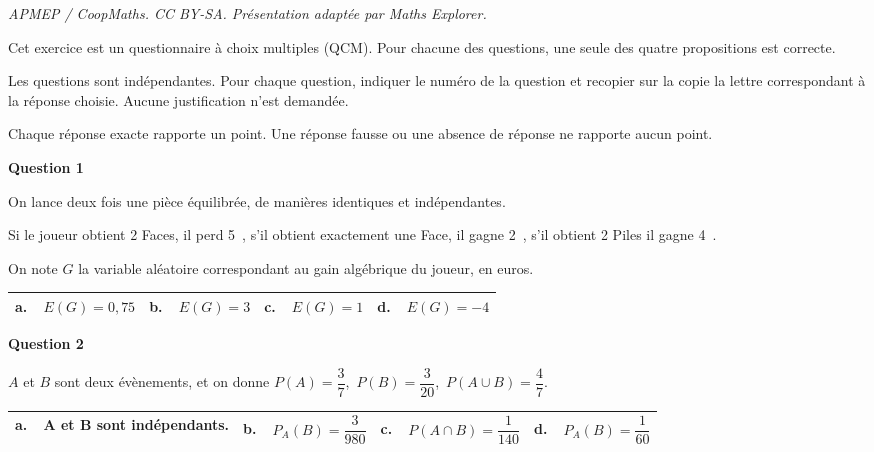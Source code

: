 \documentclass[10pt]{article}
\providecommand{\euro}{\texteuro}
\providecommand{\euro}{{\text{€}}}
\renewcommand{\euro}{\ifmmode\text{\texteuro}\else\texteuro\fi}
\begin{document}
\noindent\textit{APMEP / CoopMaths. CC BY-SA. Présentation adaptée par Maths Explorer.}\par\medskip
\medskip

Cet exercice est un questionnaire à choix multiples (QCM). Pour chacune des questions, une seule des quatre propositions est correcte.

Les questions sont indépendantes. Pour chaque question, indiquer le numéro de la question et recopier sur la copie la lettre correspondant à la réponse choisie. Aucune justification n'est demandée.

Chaque réponse exacte rapporte un point. Une réponse fausse ou une absence de réponse ne rapporte aucun point.

\medskip

\textbf{Question 1}

\medskip

On lance deux fois une pièce équilibrée, de manières identiques et indépendantes.

Si le joueur obtient 2 Faces, il perd 5~\euro, s'il obtient exactement une Face, il gagne 2~\euro, s'il obtient 2 Piles il gagne 4~\euro.

 On note $G$ la variable aléatoire correspondant au gain algébrique du joueur, en euros.

\begin{center}
\begin{tabularx}{\linewidth}{|*{4}{X|}}\hline
\textbf{a.~~}$E(G) = 0,75$& \textbf{b.~~}$E(G) = 3$&\textbf{c.~~}$E(G) = 1$&\textbf{d.~~}$E(G) =- 4$ \\ \hline
\end{tabularx}
\end{center}

\medskip

\textbf{Question 2}

\medskip

$A$ et $B$ sont deux évènements, et on donne $P(A) = \dfrac{3}{7}$,\, $P(B) = \dfrac{3}{20}$,\, $P(A \cup B) = \dfrac{4}{7}$.

\begin{center}
\begin{tabularx}{\linewidth}{|*{4}{X|}}\hline
\textbf{a.~~}A et B sont indépendants.& \textbf{b.~~}$P_A(B) = \dfrac{3}{980}$&\textbf{c.~~}$P(A \cap B) = \dfrac{1}{140}$&\textbf{d.~~}$P_A(B) = \dfrac{1}{60}$ \\ \hline
\end{tabularx}
\end{center}
\end{document}

